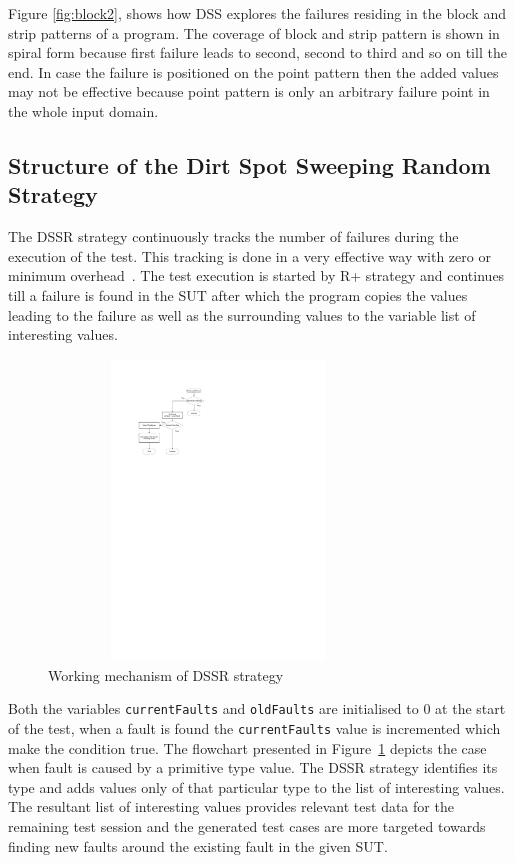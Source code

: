 \documentclass[conference]{IEEEtran}
\begin{document}
\noindent Figure \ref{fig:block2}, shows how DSS explores the failures residing in the block and strip patterns of a program. The coverage of block and strip pattern is shown in spiral form because first failure leads to second, second to third and so on till the end. In case the failure is positioned on the point pattern then the added values may not be effective because point pattern is only an arbitrary failure point in the whole input domain.

\subsection{Structure of the Dirt Spot Sweeping Random Strategy}
\noindent The DSSR strategy continuously tracks the number of failures during the execution of the test. This tracking is done in a very effective way with zero or minimum overhead~\cite{Leitner2009}. The test execution is started by R+ strategy and continues till a failure is found in the SUT after which the program copies the values leading to the failure as well as the surrounding values to the variable list of interesting values. 

\begin{figure}[ht]
\centering
\includegraphics[width= 9cm,height=8cm]{flowchart4.pdf}
\caption{Working mechanism of DSSR strategy}
\label{fig:Working_DSSS}
\end{figure}

\noindent Both the variables \verb+currentFaults+ and \verb+oldFaults+ are initialised to 0 at the start of the test, when a fault is found the \verb+currentFaults+ value is incremented which make the condition true. The flowchart presented in Figure~\ref{fig:Working_DSSS} depicts the case when fault is caused by a primitive type value. The DSSR strategy identifies its type and adds values only of that particular type to the list of interesting values. The resultant list of interesting values provides relevant test data for the remaining test session and the generated test cases are more targeted towards finding new faults around the existing fault in the given SUT.
\end{document}
